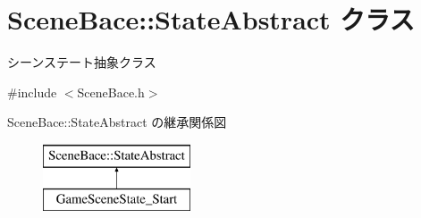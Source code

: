 \hypertarget{class_scene_bace_1_1_state_abstract}{}\section{Scene\+Bace\+:\+:State\+Abstract クラス}
\label{class_scene_bace_1_1_state_abstract}


シーンステート抽象クラス  




{\ttfamily \#include $<$Scene\+Bace.\+h$>$}

Scene\+Bace\+:\+:State\+Abstract の継承関係図\begin{figure}[H]
\begin{center}
\leavevmode
\includegraphics[height=2.000000cm]{class_scene_bace_1_1_state_abstract}
\end{center}
\end{figure}
